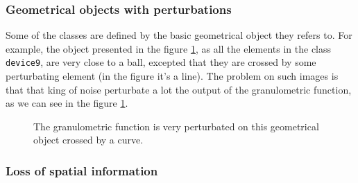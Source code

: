 \subsubsection{Geometrical objects with perturbations}

Some of the classes are defined by the basic geometrical object they refers to. For example, the object presented in the figure \ref{device9-6}, as all the elements in the class \texttt{device9}, are very close to a ball, excepted that they are crossed by some perturbating element (in the figure it's a line). The problem on such images is that that king of noise perturbate a lot the output of the granulometric function, as we can see in the figure \ref{device9-6}.

\begin{figure}[!ht]
    \centering
    \qquad\qquad\qquad
    \caption{The granulometric function is very perturbated on this geometrical object crossed by a curve.}
	\label{device9-6}
\end{figure}

\subsubsection{Loss of spatial information}

